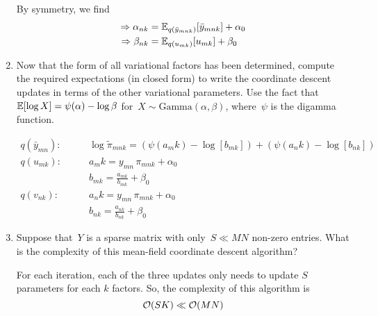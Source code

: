 \begin{enumerate}[label=(\alph*)]
\begin{solution}
By symmetry, we find
\begin{align*}
    \Rightarrow \alpha_{nk}
        &= \mathbb{E}_{q(\bar{y}_{mnk})}[\bar{y}_{mnk}] + \alpha_0\\
    \Rightarrow \beta_{nk}
        &= \mathbb{E}_{q(u_{mk})}[u_{mk}] + \beta_0
\end{align*}
\end{solution}

\item Now that the form of all variational factors has been determined, compute the required expectations (in closed form) to write the coordinate descent updates in terms of the other variational parameters.  Use the fact that~$\mathbb{E}[\log X] = \psi(\alpha) - \log \beta$ for~$X \sim \mathrm{Gamma}(\alpha, \beta)$, where~$\psi$ is the digamma function.

\begin{solution}
\begin{align*}
    q(\bar{y}_{mn}):
        &\qquad
            \log \tilde{\pi}_{mnk}
            = \left(\psi(a_mk) - \log[b_{mk}]\right) +
                \left(\psi(a_nk) - \log[b_{nk}]\right) \\
    q(u_{mk}):
        &\qquad
            a_mk   = y_{mn}\,\pi_{mnk} + \alpha_0 \\
        & \qquad
            b_{mk}= \frac{a_{mk}}{b_{mk}} + \beta_0 \\
    q(v_{nk}):
        & \qquad
            a_nk   = y_{mn}\,\pi_{mnk} + \alpha_0 \\
        & \qquad
            b_{nk}= \frac{a_{nk}}{b_{nk}} + \beta_0
\end{align*}

\end{solution}

\item Suppose that~$Y$ is a sparse matrix with only~$S \ll MN$ non-zero entries.  What is the complexity of this mean-field coordinate descent algorithm?

\begin{solution}
For each iteration, each of the three updates only needs to update $S$ parameters for each $k$ factors. So, the complexity of this algorithm is
$$\mathcal{O}(SK) \ll \mathcal{O}(MN)$$
\end{solution}

\end{enumerate}
